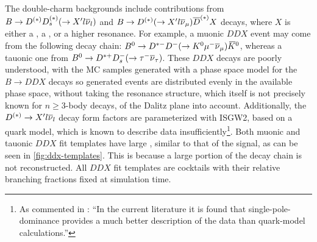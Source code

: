 The double-charm backgrounds include contributions from
$B \rightarrow D^{(*)} D_s^{(*)} (\rightarrow X' l{{\overline{\nu}}_l})$ and
$B \rightarrow D^{(*)} (\rightarrow X' l{{\overline{\nu}}_\mu}) \overline{D}^{(*)} X$
decays,
where $X$ is either a \kaon, a \Kstar, or a higher \Kstar resonance.
For example, a muonic $DDX$ event may come from the following decay chain:
${{B}^0} \rightarrow {\ensuremath{{D}^{*-}}} {\ensuremath{{D}^-}} (\rightarrow {\ensuremath{{K}^0}}{\ensuremath{\mu^-}}{\ensuremath{{\overline{\nu}}_\mu}}) {{\kern 0.18em\overline{\kern -0.18em K}}{}^0}$,
whereas a tauonic one from
${{B}^0} \rightarrow {\ensuremath{{D}^{*+}}} {\ensuremath{{D}^-_{s}}} (\rightarrow {\ensuremath{\tau^-}}{\ensuremath{{\overline{\nu}}_\tau}})$.
These $DDX$ decays are poorly understood, with the MC samples generated with
a phase space model for the $B \rightarrow DDX$ decays so generated events are
distributed evenly in the available phase space, without taking the resonance
structure,
which itself is not precisely known for $n \geq 3$-body decays,
of the Dalitz plane into account.
Additionally, the $D^{(*)} \rightarrow X' l{{\overline{\nu}}_l}$ decay form factors are
parameterized with ISGW2, based on a quark model,
which is known to describe data insufficiently\footnote{
    As commented in \cite{LHCb-ANA-2020-056}:
    ``In the current literature it is found that single-pole-dominance provides
    a much better description of the data than quark-model calculations.''
}.
Both muonic and tauonic $DDX$ fit templates have large \mmSq,
similar to that of the signal,
as can be seen in \cref{fig:ddx-templates}.
This is because a large portion of the decay chain is not reconstructed.
All $DDX$ fit templates are cocktails with their relative branching fractions
fixed at simulation time.

